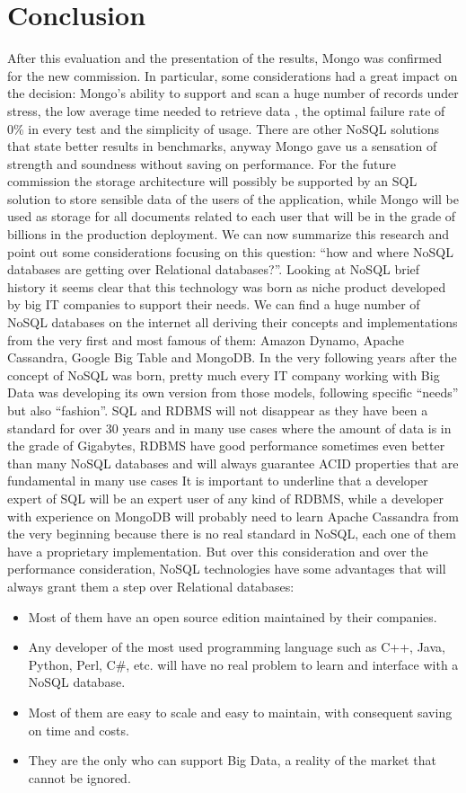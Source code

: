 \chapter{Conclusion}
\label{cha:conclusion}
After this evaluation and the presentation of the results, Mongo was confirmed for the new commission. In particular, some considerations had a great impact on the decision: Mongo's ability to support and scan a huge number of records under stress, the low average time needed to retrieve data , the optimal failure rate of 0\% in every test and the simplicity of usage.
There are other NoSQL solutions that state better results in benchmarks, anyway Mongo gave us a sensation of strength and soundness without saving on performance.
For the future commission the storage architecture will possibly be supported by an SQL solution to store sensible data of the users of the application, while Mongo will be used as storage for all documents related to each user that will be in the grade of billions in the production deployment.
We can now summarize this research and point out some considerations focusing on this question: “how and where NoSQL databases are getting over Relational databases?”.
Looking at NoSQL brief history it seems clear that this technology was born as niche product developed by big IT companies to support their needs. We can find a huge number of NoSQL databases on the internet all deriving their concepts and implementations from the very first and most famous of them: Amazon Dynamo, Apache Cassandra, Google Big Table and MongoDB.
In the very following years after the concept of NoSQL was born, pretty much every IT company working with Big Data was developing its own version from those models, following specific “needs” but also “fashion”.
SQL and RDBMS will not disappear as they have been a standard for over 30 years and in many use cases where the amount of data is in the grade of Gigabytes, RDBMS  have good performance sometimes even better than many NoSQL databases and will always guarantee ACID properties that are fundamental in many use cases
It is important to underline that a developer expert of SQL will be an expert user of any kind of RDBMS, while a developer with experience on MongoDB will probably need to learn Apache Cassandra from the very beginning because there is no real standard in NoSQL, each one of them have a proprietary implementation.
But over this consideration and over the performance consideration, NoSQL technologies have some advantages that will always grant them a step over Relational databases:
\begin{itemize}
	\item Most of them have an open source edition maintained by their companies.
	\item Any developer of the most used programming language such as C++, Java, Python, Perl, C\#, etc. will have no real problem to learn and interface with a NoSQL database.
	\item Most of them are easy to scale and easy to maintain, with consequent saving on time and costs.
	\item They are the only who can support Big Data, a reality of the market that cannot be ignored.
\end{itemize}
